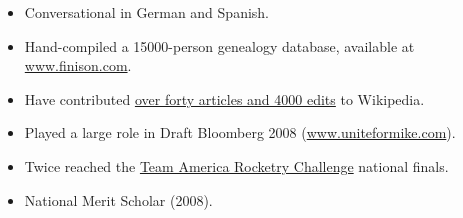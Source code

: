 \documentclass[letterpaper,10pt]{article}
\begin{document}
\begin{itemize}
	 \item Conversational in German and Spanish.\vspace{-0.2em}
	 \item Hand-compiled a 15000-person genealogy database, available at \href{http://www.finison.com}{www.finison.com}.\normalsize\vspace{-0.2em}
	 \item Have contributed \href{http://en.wikipedia.org/wiki/User:Michael_A._White}{over forty articles and 4000 edits} to Wikipedia. \vspace{-0.2em}
	 \item Played a large role in Draft Bloomberg 2008 (\href{http://www.uniteformike.com}{www.uniteformike.com}).\vspace{-0.2em}
	 \item Twice reached the \href{http://www.rocketcontest.org}{Team America Rocketry Challenge} national finals.\vspace{-0.2em}
	 \item National Merit Scholar (2008).\vspace{-0.2em}
 
\end{itemize}
\end{document}
